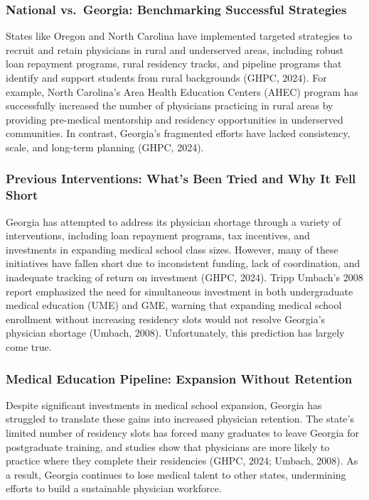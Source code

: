 \documentclass[
]{article}
\begin{document}
\subsubsection{National vs.~Georgia: Benchmarking Successful
Strategies}\label{national-vs.-georgia-benchmarking-successful-strategies}

States like Oregon and North Carolina have implemented targeted
strategies to recruit and retain physicians in rural and underserved
areas, including robust loan repayment programs, rural residency tracks,
and pipeline programs that identify and support students from rural
backgrounds (GHPC, 2024). For example, North Carolina's Area Health
Education Centers (AHEC) program has successfully increased the number
of physicians practicing in rural areas by providing pre-medical
mentorship and residency opportunities in underserved communities. In
contrast, Georgia's fragmented efforts have lacked consistency, scale,
and long-term planning (GHPC, 2024).

\subsubsection{Previous Interventions: What's Been Tried and Why It Fell
Short}\label{previous-interventions-whats-been-tried-and-why-it-fell-short}

Georgia has attempted to address its physician shortage through a
variety of interventions, including loan repayment programs, tax
incentives, and investments in expanding medical school class sizes.
However, many of these initiatives have fallen short due to inconsistent
funding, lack of coordination, and inadequate tracking of return on
investment (GHPC, 2024). Tripp Umbach's 2008 report emphasized the need
for simultaneous investment in both undergraduate medical education
(UME) and GME, warning that expanding medical school enrollment without
increasing residency slots would not resolve Georgia's physician
shortage (Umbach, 2008). Unfortunately, this prediction has largely come
true.

\subsubsection{Medical Education Pipeline: Expansion Without
Retention}\label{medical-education-pipeline-expansion-without-retention}

Despite significant investments in medical school expansion, Georgia has
struggled to translate these gains into increased physician retention.
The state's limited number of residency slots has forced many graduates
to leave Georgia for postgraduate training, and studies show that
physicians are more likely to practice where they complete their
residencies (GHPC, 2024; Umbach, 2008). As a result, Georgia continues
to lose medical talent to other states, undermining efforts to build a
sustainable physician workforce.
\end{document}
